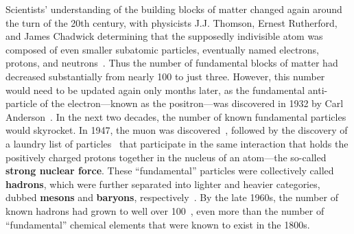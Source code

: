 Scientists' understanding of the building blocks of matter changed again around the turn of the 20th century, with physicists J.J. Thomson, Ernest Rutherford, and James Chadwick determining that the supposedly indivisible atom was composed of even smaller subatomic particles, eventually named electrons, protons, and neutrons~\cite{Electrons, Protons, Neutrons}. Thus the number of fundamental blocks of matter had decreased substantially from nearly 100 to just three. However, this number would need to be updated again only months later, as the fundamental anti-particle of the electron---known as the positron---was discovered in 1932 by Carl Anderson~\cite{Positron}. In the next two decades, the number of known fundamental particles would skyrocket. In 1947, the muon was discovered~\cite{Muon}, followed by the discovery of a laundry list of particles~\cite{Kaon,Lambda,Sigma} that participate in the same interaction that holds the positively charged protons together in the nucleus of an atom---the so-called \textbf{strong nuclear force}. These ``fundamental'' particles were collectively called \textbf{hadrons}, which were further separated into lighter and heavier categories, dubbed \textbf{mesons} and \textbf{baryons}, respectively~\cite{MesonBaryon}. By the late 1960s, the number of known hadrons had grown to well over 100~\cite{ParticleDiscoveries}, even more than the number of ``fundamental'' chemical elements that were known to exist in the 1800s.

